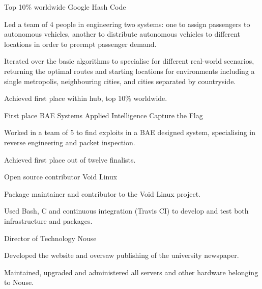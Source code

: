 
\begin{cventries}
  \cventry
    {Top 10\% worldwide} %
    {Google Hash Code} %
    {} %
    {} %
    {
      \begin{cvitems} %
        \item {Led a team of 4 people in engineering two systems: one to assign passengers to autonomous vehicles, another to distribute autonomous vehicles to different locations in order to preempt passenger demand.}
        \vspace{0.5mm}
        \item {Iterated over the basic algorithms to specialise for different real-world scenarios, returning the optimal routes and starting locations for environments including a single metropolis, neighbouring cities, and cities separated by countryside.}
        \vspace{0.5mm}
        \item {Achieved first place within hub, top 10\% worldwide.}
      \end{cvitems}
    }
    
  \cventry
    {First place}
    {BAE Systems Applied Intelligence Capture the Flag}
    {}
    {}
    {
      \begin{cvitems}
        \item {Worked in a team of 5 to find exploits in a BAE designed system, specialising in reverse engineering and packet inspection.}
        \vspace{0.5mm}
        \item {Achieved first place out of twelve finalists.}
      \end{cvitems}
    }
    
  \cventry
    {Open source contributor}
    {Void Linux}
    {}
    {}
    {
      \begin{cvitems}
        \item {Package maintainer and contributor to the Void Linux project.}
        \vspace{0.5mm}
        \item {Used Bash, C and continuous integration (Travis CI) to develop and test both infrastructure and packages.}
      \end{cvitems}
    }
    
  \cventry
    {Director of Technology}
    {Nouse}
    {}
    {}
    {
      \begin{cvitems}
        \item {Developed the website and oversaw publishing of the university newspaper.}
        \vspace{0.5mm}
        \item {Maintained, upgraded and administered all servers and other hardware belonging to Nouse.}
      \end{cvitems}
    }


\end{cventries}
